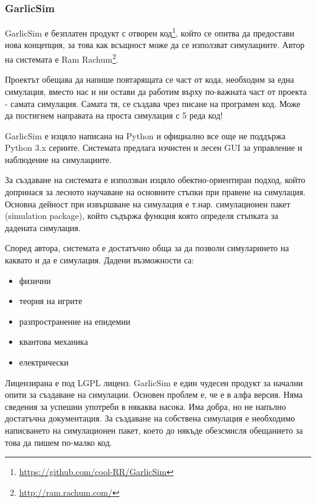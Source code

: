 		\subsubsection{GarlicSim}			
			
			GarlicSim е безплатен продукт с отворен код\footnote{\url{https://github.com/cool-RR/GarlicSim}}, 
			който се опитва да предостави нова концепция, за това как всъщност може да се използват симулациите.
			Автор на системата е Ram Rachum\footnote{\url{http://ram.rachum.com/}}.			
			
			
				Проектът обещава да напише повтарящата се част от кода, необходим за една симулация, вместо нас и ни
				остави да работим върху по-важната част от проекта - самата симулация. Самата тя, се създава чрез 
				писане на програмен код. Може да постигнем направата на проста симулация с 5 реда код!   			
			
				
				GarlicSim е изцяло написана на Python и официално все още не поддържа Python 3.x сериите. 
				Системата предлага изчистен и лесен GUI за управление и наблюдение на симулациите. 			
			
			
				За създаване на системата е използван изцяло обектно-ориентиран подход, който допринася за лесното
				научаване на основните стъпки при правене на симулация. Основна дейност при извършване на симулация
				е т.нар. симулационен пакет (simulation package), който съдържа функция която определя стъпката за
				дадената симулация.
			
			
				Според автора, системата е достатъчно обща за да позволи симуларинето на каквато и да е симулация.
				Дадени възможности са:

				\begin{itemize}
					\item физични
					\item теория на игрите
					\item разпространение на епидемии
					\item квантова механика
					\item електрически
				\end{itemize}								
				
				Лицензирана е под \ac{LGPL} лиценз. GarlicSim е един чудесен продукт за начални опити за създаване на симулации. 
				Основен проблем е, че е в алфа версия. Няма сведения за успешни употреби в някаква насока.
				Има добра, но не напълно достатъчна документация. За създаване на собствена симулация е необходимо
				написването на симулационен пакет, което до някъде обезсмисля обещанието за това да пишем по-малко код.
				\cite{GarlicSim}